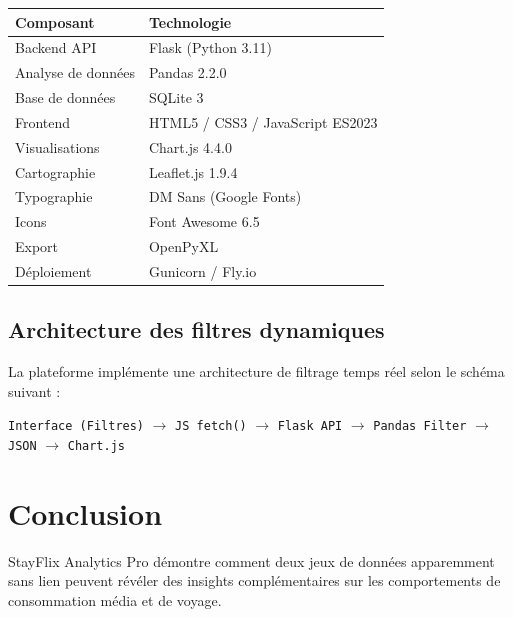 \documentclass[12pt,a4paper]{article}
\begin{document}
\begin{table}[h!]
  \centering
  \begin{tabular}{ll}
    \toprule
    \textbf{Composant} & \textbf{Technologie} \\
    \midrule
    Backend API & Flask (Python 3.11) \\
    Analyse de données & Pandas 2.2.0 \\
    Base de données & SQLite 3 \\
    Frontend & HTML5 / CSS3 / JavaScript ES2023 \\
    Visualisations & Chart.js 4.4.0 \\
    Cartographie & Leaflet.js 1.9.4 \\
    Typographie & DM Sans (Google Fonts) \\
    Icons & Font Awesome 6.5 \\
    Export & OpenPyXL \\
    Déploiement & Gunicorn / Fly.io \\
    \bottomrule
  \end{tabular}
\end{table}

\subsection{Architecture des filtres dynamiques}

La plateforme implémente une architecture de filtrage temps réel selon le schéma suivant :

\begin{center}
\texttt{Interface (Filtres)} $\rightarrow$ \texttt{JS fetch()} $\rightarrow$ \texttt{Flask API} $\rightarrow$ \texttt{Pandas Filter} $\rightarrow$ \texttt{JSON} $\rightarrow$ \texttt{Chart.js}
\end{center}

\newpage

\section{Conclusion}

StayFlix Analytics Pro démontre comment deux jeux de données apparemment sans lien peuvent révéler des insights complémentaires sur les comportements de consommation média et de voyage.

\vspace{0.5cm}
\end{document}
